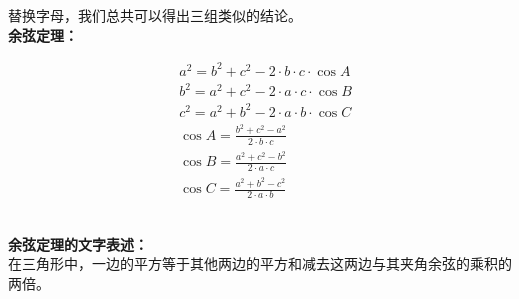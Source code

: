 \documentclass[UTF8]{ctexart}
\begin{document}
\newpage

    替换字母，我们总共可以得出三组类似的结论。\\[3mm]
    \textbf{余弦定理：}
    \begin{large}
        \begin{align*}
            &a^2=b^2+c^2-2\cdot b \cdot c \cdot \cos{A}\\[3mm]
            &b^2=a^2+c^2-2\cdot a \cdot c \cdot \cos{B}\\[3mm]
            &c^2=a^2+b^2-2\cdot a \cdot b \cdot \cos{C}\\[3mm]
            &\cos{A}=\frac{b^2+c^2-a^2}{2\cdot b\cdot c}\\[3mm]
            &\cos{B}=\frac{a^2+c^2-b^2}{2\cdot a\cdot c}\\[3mm]
            &\cos{C}=\frac{a^2+b^2-c^2}{2\cdot a\cdot b}
        \end{align*}
    \end{large}\\
    \textbf{余弦定理的文字表述：}\\[2mm]
    在三角形中，一边的平方等于其他两边的平方和减去这两边与其夹角余弦的乘积的两倍。
    

\newpage
\end{document}
